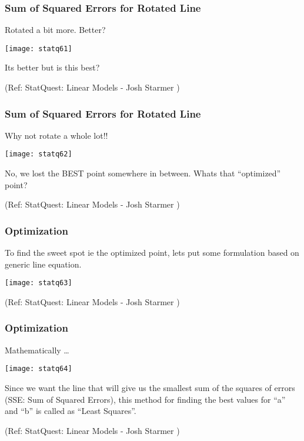 \begin{frame}[fragile]\frametitle{Sum of Squared Errors for Rotated Line}
Rotated a bit more. Better?


\begin{center}
\texttt{[image: statq61]}
\end{center}

Its better but is this best?

\tiny{(Ref: StatQuest: Linear Models - Josh Starmer )}	

\end{frame}

\begin{frame}[fragile]\frametitle{Sum of Squared Errors for Rotated Line}
Why not rotate a whole lot!!


\begin{center}
\texttt{[image: statq62]}
\end{center}

No, we lost the BEST point somewhere in between. Whats that ``optimized'' point?

\tiny{(Ref: StatQuest: Linear Models - Josh Starmer )}	

\end{frame}

\begin{frame}[fragile]\frametitle{Optimization}
To find the sweet spot ie the optimized point, lets put some formulation based on generic line equation.


\begin{center}
\texttt{[image: statq63]}
\end{center}



\tiny{(Ref: StatQuest: Linear Models - Josh Starmer )}	

\end{frame}

\begin{frame}[fragile]\frametitle{Optimization}
Mathematically \ldots

\begin{center}
\texttt{[image: statq64]}
\end{center}

Since we want the line that will give us the smallest sum of the squares of errors (SSE: Sum of Squared Errors), this method for finding the best values for ``a'' and ``b'' is called as ``Least Squares''.

\tiny{(Ref: StatQuest: Linear Models - Josh Starmer )}	

\end{frame}

